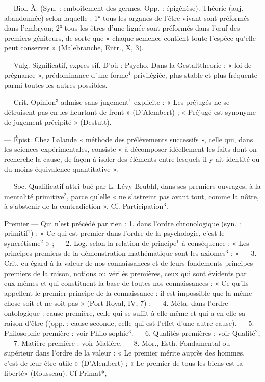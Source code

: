 \begin{itemize}[leftmargin=1cm, label=, itemsep=1pt]
 — Biol. À. (Syn. : emboîtement des germes. Opp. : épigénèse). Théorie (auj. abandonnée)
selon laquelle : 1° tous les organes
de l'être vivant sont préformés dans
l'embryon; 2° tous les êtres d’une
lignée sont préformés dans l'œuf des
premiers géniteurs, de sorte que
« chaque semence contient toute
l'espèce qu’elle peut conserver »
(Malebranche, Entr., X, 3).

 — Vulg. Significatif, expres
sif. D'où : Psycho. Dans la Gestalttheorie :
« loi de prégnance », prédominance d’une forme$^4$ privilégiée,
plus stable et plus fréquente parmi
toutes les autres possibles.

 — Crit. Opinion$^3$ admise sans
jugement$^1$ explicite : « Les préjugés ne se détruisent pas en les
heurtant de front » (D’Alembert) ;
« Préjugé est synonyme de jugement précipité » (Destutt).

 — Épist. Chez Lalande
« méthode des prélèvements successifs », celle qui, dans les sciences
expérimentales, consiste « à décomposer idéellement les faits dont on
recherche la cause, de façon à isoler
des éléments entre lesquels il y ait
identité ou du moins équivalence
quantitative ».

 — Soc. Qualificatif attri
bué par L. Lévy-Brubhl, dans ses
premiers ouvrages, à la mentalité
primitive$^2$, parce qu'elle « ne s’astreint pas avant tout, comme la
nôtre, à s'abstenir de la contradiction ». Cf. Participation$^3$.

Premier\ib{} — Qui n’est précédé par rien :
1. dans l’ordre chronologique (syn. :
primitif$^1$) : « Ce qui est premier dans
l’ordre de la psychologie, c’est le
syncrétisme$^2$ » ; — 2. Log. selon la
relation de principe$^1$ à conséquence :
« Les principes premiers de la démonstration mathématique sont les
axiomes$^3$ ; » — 3. Crit. eu égard à la
valeur de nos connaissances et de
leurs fondements principes premiers de la raison, notions ou vérilés
premières, ceux qui sont évidents
par eux-mêmes et qui constituent
la base de toutes nos connaissances :
« Ce qu'ils appellent le premier principe de la connaissance : il est impossible que la même chose soit et
ne soit pas » (Port-Royal, IV, 7) ; —
4. Méta. dans l'ordre ontologique :
cause première, celle qui se suffit à
elle-même et qui a en elle sa raison
d’être ((opp. : cause seconde, celle qui
est l’effet d’une autre cause). —
5. Philosophie première : voir Philo
sophie$^3$. — 6. Qualités premières :
voir Qualité$^2$, — 7. Matière première :
voir Matière. — 8. Mor., Esth.
Fondamental ou supérieur dans
l’ordre de la valeur : « Le premier
mérite auprès des hommes, c’est de
leur être utile » (D’Alembert) ; « Le
premier de tous les biens est la
liberté» (Rousseau). Cf Primat*,


\end{itemize}
